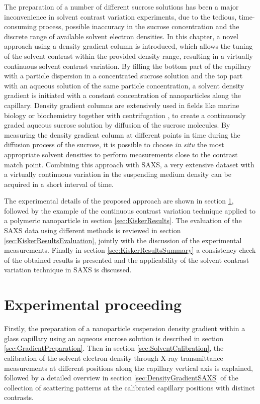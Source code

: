 The preparation of a number of different sucrose solutions has been a major inconvenience in solvent contrast variation experiments, due to the tedious, time-consuming process, possible inaccuracy in the sucrose concentration and the discrete range of available solvent electron densities. In this chapter, a novel approach using a density gradient column is introduced, which allows the tuning of the solvent contrast within the provided density range, resulting in a virtually continuous solvent contrast variation. By filling the bottom part of the capillary with a particle dispersion in a concentrated sucrose solution and the top part with an aqueous solution of the same particle concentration, a solvent density gradient is initiated with a constant concentration of nanoparticles along the capillary. Density gradient columns are extensively used in fields like marine biology \citet{coombs_density-gradient_1981} or biochemistry together with centrifugation \citet{hinton_density_1978}, to create a continuously graded aqueous sucrose solution by diffusion of the sucrose molecules. By measuring the density gradient column at different points in time during the diffusion process of the sucrose, it is possible to choose \emph{in situ} the most appropriate solvent densities to perform measurements close to the contrast match point. Combining this approach with SAXS, a very extensive dataset with a virtually continuous variation in the suspending medium density can be acquired in a short interval of time.

The experimental details of the proposed approach are shown in section \ref{sec:DensityGradientExperimental}, followed by the example of the continuous contrast variation technique applied to a polymeric nanoparticle in section \ref{sec:KiskerResults}. The evaluation of the SAXS data using different methods is reviewed in section \ref{sec:KiskerResultsEvaluation}, jointly with the discussion of the experimental measurements. Finally in section \ref{sec:KiskerResultsSummary} a consistency check of the obtained results is presented and the applicability of the solvent contrast variation technique in SAXS is discussed.


\section{Experimental proceeding}
\label{sec:DensityGradientExperimental}
Firstly, the preparation of a nanoparticle suspension density gradient within a glass capillary using an aqueous sucrose solution is described in section \ref{sec:GradientPreparation}. Then in section \ref{sec:SolventCalibration}, the calibration of the solvent electron density through X-ray transmittance measurements at different positions along the capillary vertical axis is explained, followed by a detailed overview in section \ref{sec:DensityGradientSAXS} of the collection of scattering patterns at the calibrated capillary positions with distinct contrasts.


